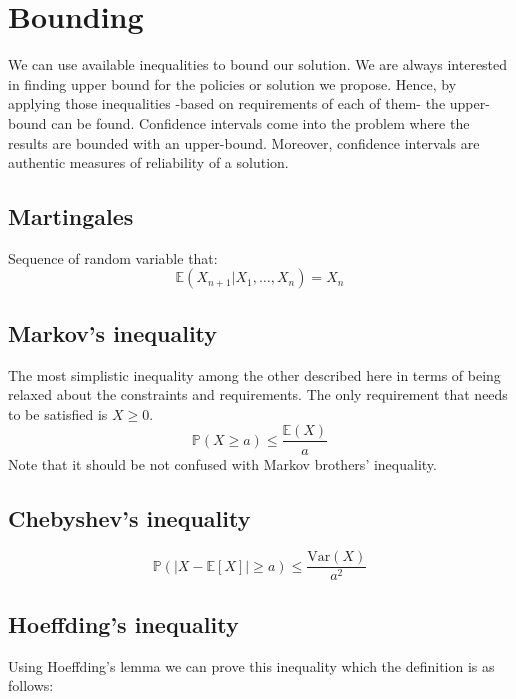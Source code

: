 \documentclass[a4paper,12pt]{article}
\begin{document}

\section{Bounding}
We can use available inequalities to bound our solution. We are always interested in finding upper bound for the policies or solution we propose. Hence, by applying those inequalities -based on requirements of each of them- the upper-bound can be found. Confidence intervals come into the problem where the results are bounded with an upper-bound. Moreover, confidence intervals are authentic measures of reliability of a solution.

\subsection{Martingales}
Sequence of random variable that:
\begin{equation}
    \mathbb { E } \left( X _ { n + 1 } | X _ { 1 } , \ldots , X _ { n } \right) = X _ { n }
\end{equation}

\subsection{Markov's inequality}
The most simplistic inequality among the other described here in terms of being relaxed about the constraints and requirements. The only requirement that needs to be satisfied is $X \geq 0$.
\begin{equation}
\mathbb {P}(X \geq a ) \leq \frac { \mathbb { E}( X ) } { a }
\end{equation}
Note that it should be not confused with Markov brothers' inequality.

\subsection{Chebyshev's inequality}
\begin{equation}
\mathbb {P}(|X - \mathbb{E}[X]| \geq a ) \leq \frac { \mathrm { Var}( X ) } { a^2 }
\end{equation}


\subsection{Hoeffding's inequality}
Using Hoeffding's lemma we can prove this inequality which the definition is as follows:
\end{document}
